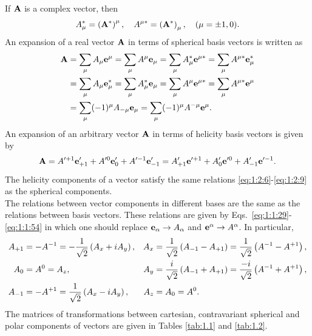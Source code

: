 If \(\mathbf{A}\) is a complex vector, then
\begin{equation}
A_{\mu}^{*}=\left(\mathbf{A}^{*}\right)^{\mu}, \quad A^{\mu *}=\left(\mathbf{A}^{*}\right)_{\mu}, \quad(\mu= \pm 1,0) . \label{eq:1:2:8}
\end{equation}
An expansion of a real vector \(\mathbf{A}\) in terms of spherical basis vectors is written as
\begin{align}
\mathbf{A} & =\sum_{\mu} A_{\mu} \mathbf{e}^{\mu}=\sum_{\mu} A^{\mu} \mathbf{e}_{\mu}=\sum_{\mu} A_{\mu}^{*} \mathbf{e}^{\mu *}=\sum_{\mu} A^{\mu *} \mathbf{e}_{\mu}^{*}  \notag\\
& =\sum_{\mu} A_{\mu} \mathbf{e}_{\mu}^{*}=\sum_{\mu} A_{\mu}^{*} \mathbf{e}_{\mu}=\sum_{\mu} A^{\mu} \mathbf{e}^{\mu *}=\sum_{\mu} A^{\mu *} \mathbf{e}^{\mu}  \notag\\
& =\sum_{\mu}(-1)^{\mu} A_{-\mu} \mathbf{e}_{\mu}=\sum_{\mu}(-1)^{\mu} A^{-\mu} \mathbf{e}^{\mu} . \label{eq:1:2:9}
\end{align}
An expansion of an arbitrary vector \(\mathbf{A}\) in terms of helicity basis vectors is given by
\begin{equation}
\mathbf{A}=A^{\prime+1} \mathbf{e}_{+1}^{\prime}+A^{\prime 0} \mathbf{e}_{0}^{\prime}+A^{\prime-1} \mathbf{e}_{-1}^{\prime}=A_{+1}^{\prime} \mathbf{e}^{\prime+1}+A_{0}^{\prime} \mathbf{e}^{\prime 0}+A_{-1}^{\prime} \mathbf{e}^{\prime-1} . \label{eq:1:2:10}
\end{equation}
The helicity components of a vector satisfy the same relations \eqref{eq:1:2:6}-\eqref{eq:1:2:9} as the spherical components.\\
The relations between vector components in different bases are the same as the relations between basis vectors. These relations are given by Eqs.~\eqref{eq:1:1:29}-\eqref{eq:1:1:54} in which one should replace \(\mathbf{e}_{\alpha} \rightarrow A_{\alpha}\) and \(\mathbf{e}^{\alpha} \rightarrow A^{\alpha}\). In particular,
\begin{alignat}{2}
A_{+1} & =-A^{-1}=-\frac{1}{\sqrt{2}}\left(A_{x}+i A_{y}\right), & A_{x}&=\frac{1}{\sqrt{2}}\left(A_{-1}-A_{+1}\right)=\frac{1}{\sqrt{2}}\left(A^{-1}-A^{+1}\right),  \notag\\
A_{0} & =A^{0}=A_{z}, & A_{y}&=\frac{i}{\sqrt{2}}\left(A_{-1}+A_{+1}\right)=\frac{-i}{\sqrt{2}}\left(A^{-1}+A^{+1}\right),  \label{eq:1:2:11}\\
A_{-1} & =-A^{+1}=\frac{1}{\sqrt{2}}\left(A_{x}-i A_{y}\right), & A_{z}&=A_{0}=A^{0} . \notag
\end{alignat}
The matrices of transformations between cartesian, contravariant spherical and polar components of vectors are given in Tables \ref{tab:1.1} and \ref{tab:1.2}.

